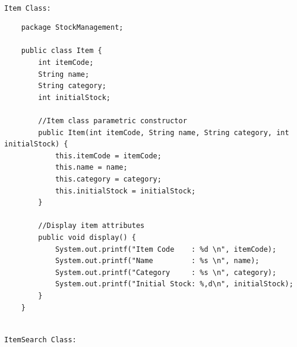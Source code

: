 \documentclass[12pt,titlepage]{article}
\begin{document}
\mbox{}\\
\texttt{Item Class:}
\mbox{}\\
\begin{verbatim}
    package StockManagement;

    public class Item {
        int itemCode;
        String name;
        String category;
        int initialStock;

        //Item class parametric constructor
        public Item(int itemCode, String name, String category, int initialStock) {
            this.itemCode = itemCode;
            this.name = name;
            this.category = category;
            this.initialStock = initialStock;
        }

        //Display item attributes
        public void display() {
            System.out.printf("Item Code    : %d \n", itemCode);
            System.out.printf("Name         : %s \n", name);
            System.out.printf("Category     : %s \n", category);
            System.out.printf("Initial Stock: %,d\n", initialStock);
        }
    }
\end{verbatim}
\mbox{}\\
\texttt{ItemSearch Class:}
\mbox{}\\
\end{document}
